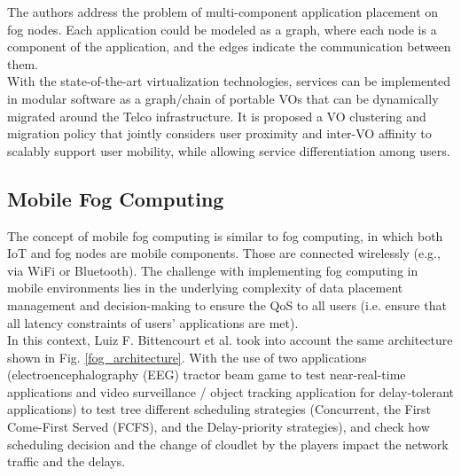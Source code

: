 \cite{bahreini2017efficient}
The authors address the problem of multi-component application placement on fog nodes. Each application could be modeled as a graph, where each node is a component of the application, and the edges indicate the communication between them.\\


\cite{bruschi2018move}
With the state-of-the-art virtualization technologies, services can be implemented in modular software as a graph/chain of portable VOs that can be dynamically migrated around the Telco infrastructure. It is proposed a VO clustering and migration policy that jointly considers user proximity and inter-VO affinity to scalably support user mobility, while allowing service differentiation among users.



 

\subsection{Mobile Fog Computing}
\label{sec:Mobility}
The concept of mobile fog computing is similar to fog computing, in which both IoT and fog nodes are mobile components. Those are connected wirelessly (e.g., via WiFi or Bluetooth). The challenge with implementing fog computing in mobile environments lies in the underlying complexity of data placement management and decision-making to ensure the QoS to all users (i.e. ensure that all latency constraints of users' applications are met).\\

In this context, Luiz F. Bittencourt et al. \cite{bittencourt2017mobility} took into account the same architecture shown in Fig. \ref{fog_architecture}. With the use of two applications (electroencephalography (EEG) tractor beam game to test near-real-time applications and video surveillance / object tracking application for delay-tolerant applications) to test tree different scheduling strategies (Concurrent, the First Come-First Served (FCFS), and the Delay-priority strategies), and check how scheduling decision and the change of cloudlet by the players impact the network traffic and the delays.\\

